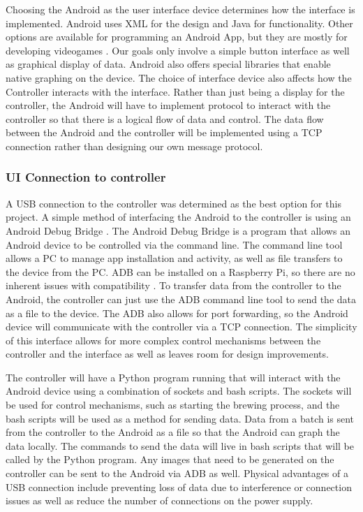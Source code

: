 \documentclass[draftclsnofoot,onecolumn,letterpaper,10pt]{IEEEtran}
\begin{document}
Choosing the Android as the user interface device determines how the interface is implemented.
Android uses XML for the design and Java for functionality.
Other options are available for programming an Android App, but they are mostly for developing videogames \cite{Pygame}.
Our goals only involve a simple button interface as well as graphical display of data.
Android also offers special libraries that enable native graphing on the device. 
The choice of interface device also affects how the Controller interacts with the interface.
Rather than just being a display for the controller, the Android will have to implement protocol to interact with the controller so that there is a logical flow of data and control.
The data flow between the Android and the controller will be implemented using a TCP connection rather than designing our own message protocol.

\subsubsection{UI Connection to controller}
A USB connection to the controller was determined as the best option for this project.
A simple method of interfacing the Android to the controller is using an Android Debug Bridge \cite{ADBDOCS}.
The Android Debug Bridge is a program that  allows an Android device to be controlled via the command line.
The command line tool allows a PC to manage app installation and activity, as well as file transfers to the device from the PC.
ADB can be installed on a Raspberry Pi, so there are no inherent issues with compatibility \cite{ADBPI}.
To transfer data from the controller to the Android, the controller can just use the ADB command line tool to send the data as a file to the device.
The ADB also allows for port forwarding, so the Android device will communicate with the controller via a TCP connection.
The simplicity of this interface allows for more complex control mechanisms between the controller and the interface as well as leaves room for design improvements.

The controller will have a Python program running that will interact with the Android device using a combination of sockets and bash scripts.
The sockets will be used for control mechanisms, such as starting the brewing process, and the bash scripts will be used as a method for sending data.
Data from a batch is sent from the controller to the Android as a file so that the Android can graph the data locally.
The commands to send the data will live in bash scripts that will be called by the Python program.
Any images that need to be generated on the controller can be sent to the Android via ADB as well.
Physical advantages of a USB connection include preventing loss of data due to interference or connection issues as well as reduce the number of connections on the power supply.
\end{document}
